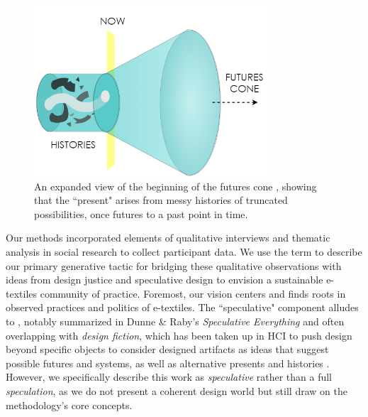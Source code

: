 \begin{figure}[ht]
  \centering
  \includegraphics[height=2.5in]{figs/EST_Future Cone.png}
  \caption[Illustration combining the ``futures cone'' from speculative design with design justice's acknowledgement of historical violence.]{An expanded view of the beginning of the futures cone \cite{dunne_speculative_2013}, showing that the ``present" arises from messy histories of truncated possibilities, once futures to a past point in time.}
  \label{fig:justice-futures-cone}
\end{figure}

Our methods incorporated elements of qualitative interviews \cite{braun_online_2020, fontana_interviewing_2007} and thematic analysis \cite{maguire_doing_2017, braun_using_2006} in social research to collect participant data.
We use the term  to describe our primary generative tactic for bridging these qualitative observations with ideas from design justice and speculative design to envision a sustainable e-textiles community of practice. Foremost, our vision centers  \cite{costanza-chock_design_2020} and finds roots in observed practices and politics of e-textiles. The ``speculative" component alludes to , notably summarized in Dunne \& Raby's \textit{Speculative Everything} \cite{dunne_speculative_2013} and often overlapping with \textit{design fiction}, which has been taken up in HCI to push design beyond specific objects to consider designed artifacts as ideas that suggest possible futures and systems, as well as alternative presents and histories \cite{akama_speculative_2016, baumann_infrastructures_2017, wakkary_sustainable_2013}. However, we specifically describe this work as \textit{speculative} rather than a full \textit{speculation}, as we do not present a coherent design world but still draw on the methodology's core concepts.

